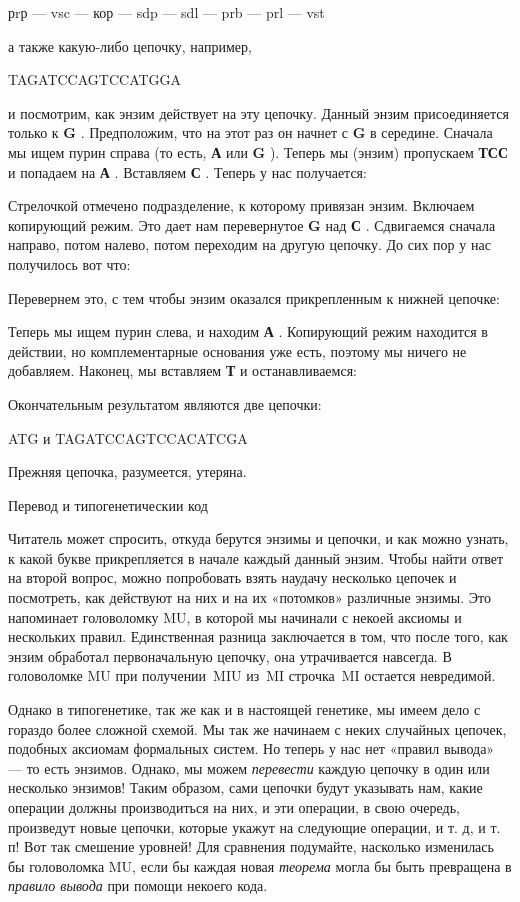 \documentclass[../main.tex]{subfiles}
\begin{document}
рrр --- vsc --- кор --- sdp --- sdl --- prb --- prl --- vst

а также какую-либо цепочку, например,

TAGATCCAGTCCATGGA

и посмотрим, как энзим действует на эту цепочку. Данный энзим присоединяется только к \textbf{G} . Предположим, что на этот раз он начнет с \textbf{G} в середине. Сначала мы ищем пурин справа (то есть, \textbf{А} или \textbf{G} ). Теперь мы (энзим) пропускаем \textbf{ТСС} и попадаем на \textbf{А} . Вставляем \textbf{С} . Теперь у нас получается:

Стрелочкой отмечено подразделение, к которому привязан энзим. Включаем копирующий режим. Это дает нам перевернутое \textbf{G} над \textbf{С} . Сдвигаемся сначала направо, потом налево, потом переходим на другую цепочку. До сих пор у нас получилось вот что:

Перевернем это, с тем чтобы энзим оказался прикрепленным к нижней цепочке:

Теперь мы ищем пурин слева, и находим \textbf{А} . Копирующий режим находится в действии, но комплементарные основания уже есть, поэтому мы ничего не добавляем. Наконец, мы вставляем \textbf{Т} и останавливаемся:

Окончательным результатом являются две цепочки:

ATG и TAGATCCAGTCCACATCGA

Прежняя цепочка, разумеется, утеряна.

Перевод и типогенетическии код

Читатель может спросить, откуда берутся энзимы и цепочки, и как можно узнать, к какой букве прикрепляется в начале каждый данный энзим. Чтобы найти ответ на второй вопрос, можно попробовать взять наудачу несколько цепочек и посмотреть, как действуют на них и на их «потомков» различные энзимы. Это напоминает головоломку MU, в которой мы начинали с некоей аксиомы и нескольких правил. Единственная разница заключается в том, что после того, как энзим обработал первоначальную цепочку, она утрачивается навсегда. В головоломке MU при получении~MIU из~MI строчка~MI остается невредимой.

Однако в типогенетике, так же как и в настоящей генетике, мы имеем дело с гораздо более сложной схемой. Мы так же начинаем с неких случайных цепочек, подобных аксиомам формальных систем. Но теперь у нас нет «правил вывода» --- то есть энзимов. Однако, мы можем \emph{перевести} каждую цепочку в один или несколько энзимов! Таким образом, сами цепочки будут указывать нам, какие операции должны производиться на них, и эти операции, в свою очередь, произведут новые цепочки, которые укажут на следующие операции, и т. д, и т. п! Вот так смешение уровней! Для сравнения подумайте, насколько изменилась бы головоломка MU, если бы каждая новая \emph{теорема} могла бы быть превращена в \emph{правило вывода} при помощи некоего кода.
\end{document}
